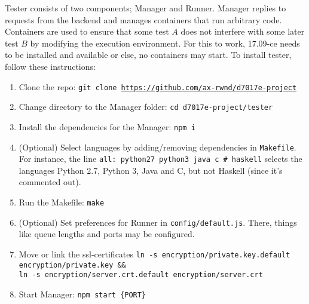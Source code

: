 Tester consists of two components; Manager and Runner. Manager replies to requests from the backend and manages \docker{} containers that run arbitrary code. Containers are used to ensure that some test $A$ does not interfere with some later test $B$ by modifying the execution environment. For this to work, \docker{} 17.09-ce needs to be installed and available or else, no containers may start. To install tester, follow these instructions:
\begin{enumerate}
    \item Clone the repo: \texttt{git clone \url{https://github.com/ax-rwnd/d7017e-project}}
    \item Change directory to the Manager folder: \texttt{cd d7017e-project/tester}
    \item Install the dependencies for the Manager: \texttt{npm i}
    \item (Optional) Select languages by adding/removing dependencies in \texttt{Makefile}. For instance, the line \texttt{all: python27 python3 java c \# haskell} selects the languages Python 2.7, Python 3, Java and C, but not Haskell (since it's commented out).
    \item Run the Makefile: \texttt{make}
    \item (Optional) Set preferences for Runner in \texttt{config/default.js}. There, things like queue lengths and ports may be configured.
    \item Move or link the ssl-certificates \texttt{ln -s encryption/private.key.default \\
    encryption/private.key \&\& \\
    ln -s encryption/server.crt.default encryption/server.crt}
    \item Start Manager: \texttt{npm start \{PORT\}}
\end{enumerate}


